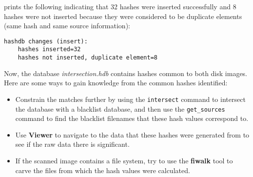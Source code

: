 \hash prints the following indicating that 32 hashes were inserted successfully and 8 hashes were not inserted because they were considered to be duplicate elements (same hash and same source information):
\begingroup
\footnotesize
\begin{Verbatim}[fontfamily=courier]
hashdb changes (insert):
    hashes inserted=32
    hashes not inserted, duplicate element=8
\end{Verbatim}
\endgroup

Now, the database \textit{intersection.hdb} contains hashes common to both disk images. \\

Here are some ways to gain knowledge from the common hashes identified:
\begin{itemize}
\item Constrain the matches further by using the \texttt{intersect} command
to intersect the database with a blacklist database,
and then use the \texttt{get\_sources} command
to find the blacklist filenames that these hash values correspond to.
\item Use \bulk \textbf{Viewer} to navigate to the data that these hashes were generated from
to see if the raw data there is significant.
\item If the scanned image contains a file system,
try to use the \textbf{fiwalk} tool to carve the files from which the hash values
were calculated.
\end{itemize}
